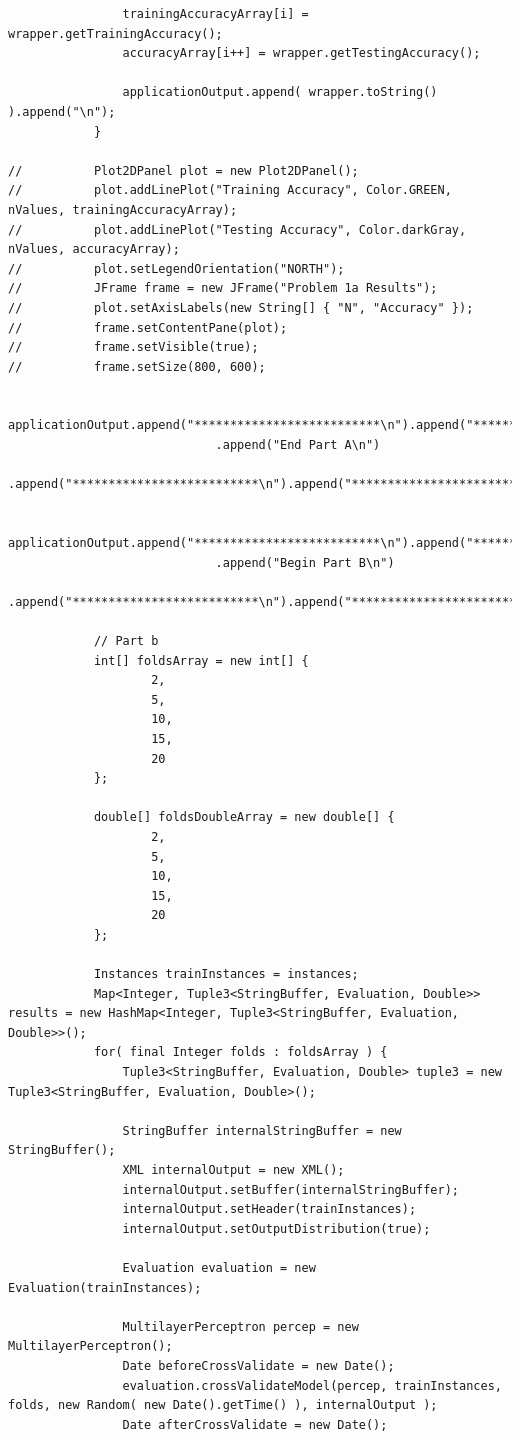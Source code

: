 \begin{lstlisting}
				trainingAccuracyArray[i] = wrapper.getTrainingAccuracy();
				accuracyArray[i++] = wrapper.getTestingAccuracy();
				
				applicationOutput.append( wrapper.toString() ).append("\n");
			}	
			
//			Plot2DPanel plot = new Plot2DPanel();
//			plot.addLinePlot("Training Accuracy", Color.GREEN, nValues, trainingAccuracyArray);
//			plot.addLinePlot("Testing Accuracy", Color.darkGray, nValues, accuracyArray);
//			plot.setLegendOrientation("NORTH");
//			JFrame frame = new JFrame("Problem 1a Results");
//			plot.setAxisLabels(new String[] { "N", "Accuracy" });
//			frame.setContentPane(plot);
//			frame.setVisible(true);
//			frame.setSize(800, 600);
						
			applicationOutput.append("**************************\n").append("**************************\n").append("**************************\n")
							 .append("End Part A\n")
							 .append("**************************\n").append("**************************\n").append("**************************\n\n");
			
			applicationOutput.append("**************************\n").append("**************************\n").append("**************************\n")
							 .append("Begin Part B\n")
							 .append("**************************\n").append("**************************\n").append("**************************\n");
							
			// Part b			
			int[] foldsArray = new int[] {
					2,
					5,
					10,
					15,
					20
			};
			
			double[] foldsDoubleArray = new double[] {
					2,
					5,
					10,
					15,
					20
			};
			
			Instances trainInstances = instances;
			Map<Integer, Tuple3<StringBuffer, Evaluation, Double>> results = new HashMap<Integer, Tuple3<StringBuffer, Evaluation, Double>>();
			for( final Integer folds : foldsArray ) {
				Tuple3<StringBuffer, Evaluation, Double> tuple3 = new Tuple3<StringBuffer, Evaluation, Double>();
				
				StringBuffer internalStringBuffer = new StringBuffer();
				XML internalOutput = new XML();
				internalOutput.setBuffer(internalStringBuffer);
				internalOutput.setHeader(trainInstances);
				internalOutput.setOutputDistribution(true);

				Evaluation evaluation = new Evaluation(trainInstances);
				
				MultilayerPerceptron percep = new MultilayerPerceptron();
				Date beforeCrossValidate = new Date();
				evaluation.crossValidateModel(percep, trainInstances, folds, new Random( new Date().getTime() ), internalOutput );
				Date afterCrossValidate = new Date();
				

\end{lstlisting}
